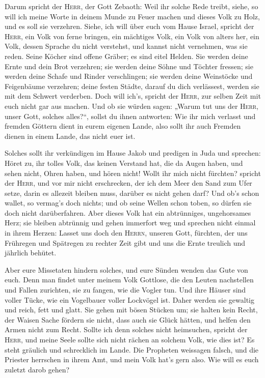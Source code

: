  Darum spricht der \textsc{Herr}, der Gott Zebaoth: Weil
ihr solche Rede treibt, siehe, so will ich meine Worte in deinem Munde
zu Feuer machen und dieses Volk zu Holz, und es soll sie verzehren.
 Siehe, ich will über euch vom Hause Israel, spricht der
\textsc{Herr}, ein Volk von ferne bringen, ein mächtiges Volk, ein Volk
von alters her, ein Volk, dessen Sprache du nicht verstehst, und kannst
nicht vernehmen, was sie reden.  Seine Köcher sind offene
Gräber; es sind eitel Helden.  Sie werden deine Ernte und
dein Brot verzehren; sie werden deine Söhne und Töchter fressen; sie
werden deine Schafe und Rinder verschlingen; sie werden deine Weinstöcke
und Feigenbäume verzehren; deine festen Städte, darauf du dich
verlässest, werden sie mit dem Schwert verderben.  Doch
will ich's, spricht der \textsc{Herr}, zur selben Zeit mit euch nicht
gar aus machen.  Und ob sie würden sagen: „Warum tut uns
der \textsc{Herr}, unser Gott, solches alles?{}``, sollst du ihnen
antworten: Wie ihr mich verlasst und fremden Göttern dient in eurem
eigenen Lande, also sollt ihr auch Fremden dienen in einem Lande, das
nicht euer ist.

 Solches sollt ihr verkündigen im Hause Jakob und
predigen in Juda und sprechen:  Höret zu, ihr tolles
Volk, das keinen Verstand hat, die da Augen haben, und sehen nicht,
Ohren haben, und hören nicht!  Wollt ihr mich nicht
fürchten? spricht der \textsc{Herr}, und vor mir nicht erschrecken, der
ich dem Meer den Sand zum Ufer setze, darin es allezeit bleiben muss,
darüber es nicht gehen darf? Und ob's schon wallet, so vermag's doch
nichts; und ob seine Wellen schon toben, so dürfen sie doch nicht
darüberfahren.  Aber dieses Volk hat ein abtrünniges,
ungehorsames Herz; sie bleiben abtrünnig und gehen immerfort weg
 und sprechen nicht einmal in ihrem Herzen: Lasset uns
doch den \textsc{Herrn}, unseren Gott, fürchten, der uns Frühregen und
Spätregen zu rechter Zeit gibt und uns die Ernte treulich und jährlich
behütet.

 Aber eure Missetaten hindern solches, und eure Sünden
wenden das Gute von euch.  Denn man findet unter meinem
Volk Gottlose, die den Leuten nachstellen und Fallen zurichten, sie zu
fangen, wie die Vogler tun.  Und ihre Häuser sind voller
Tücke, wie ein Vogelbauer voller Lockvögel ist. Daher werden sie
gewaltig und reich, fett und glatt.  Sie gehen mit bösen
Stücken um; sie halten kein Recht, der Waisen Sache fördern sie nicht,
dass auch sie Glück hätten, und helfen den Armen nicht zum Recht.
 Sollte ich denn solches nicht heimsuchen, spricht der
\textsc{Herr}, und meine Seele sollte sich nicht rächen an solchem Volk,
wie dies ist?  Es steht gräulich und schrecklich im
Lande.  Die Propheten weissagen falsch, und die Priester
herrschen in ihrem Amt, und mein Volk hat's gern also. Wie will es euch
zuletzt darob gehen?


